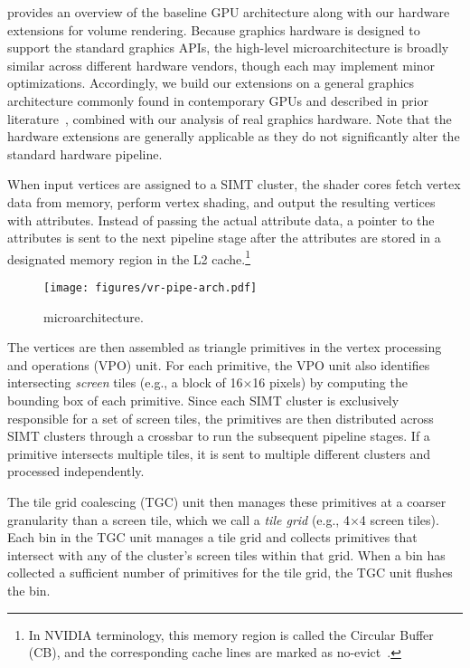 

 provides an overview of the baseline GPU architecture
along with our hardware extensions for volume rendering. Because graphics
hardware is designed to support the standard graphics APIs, the high-level
microarchitecture is broadly similar across different hardware vendors, though
each may implement minor optimizations. Accordingly, we build our extensions on
a general graphics architecture commonly found in contemporary GPUs and
described in prior
literature~\cite{gub:aam19,tin:sax23,lin:mor09,rho:mol14,pur:mol13}, combined
with our analysis of real graphics hardware. Note that the hardware extensions
are generally applicable as they do not significantly alter the standard
hardware pipeline.

When input vertices are assigned to a SIMT cluster, the shader cores fetch
vertex data from memory, perform vertex shading, and output the resulting
vertices with attributes. 
%
Instead of passing the actual attribute data, a pointer to the attributes is
sent to the next pipeline stage after the attributes are stored in a designated
memory region in the L2 cache.\footnote{In NVIDIA terminology, this memory
region is called the Circular Buffer (CB), and the corresponding cache lines
are marked as no-evict~\cite{rho:mol14}.}

\begin{figure}[t]
  \centering
  \texttt{[image: figures/vr-pipe-arch.pdf]}
  \caption{\name{} microarchitecture.}
  \vspace{-0.20in}
  \label{fig:vr-pipe-arch}
\end{figure}

The vertices are then assembled as triangle primitives in the vertex processing
and operations (VPO) unit. For each primitive, the VPO unit also identifies
intersecting \emph{screen} tiles (e.g., a block of 16$\times$16 pixels) by
computing the bounding box of each primitive. Since each SIMT cluster is
exclusively responsible for a set of screen tiles, the primitives are then
distributed across SIMT clusters through a crossbar to run the subsequent
pipeline stages. If a primitive intersects multiple tiles, it is sent to
multiple different clusters and processed independently.

The tile grid coalescing (TGC) unit then manages these primitives at a coarser
granularity than a screen tile, which we call a \emph{tile grid} (e.g.,
4$\times$4 screen tiles).
%
Each bin in the TGC unit manages a tile grid and collects primitives that
intersect with any of the cluster's screen tiles within that grid.
%
When a bin has collected a sufficient number of primitives for the tile grid,
the TGC unit flushes the bin.

